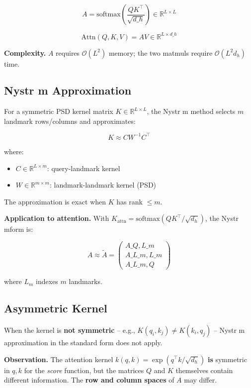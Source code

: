 \[
A = \text{softmax}\!\left(\frac{Q K^\top}{\sqrt{d\_h}}\right) \in \mathbb{R}^{L \times L}
\]

\[
\text{Attn}(Q, K, V) = A V \in \mathbb{R}^{L \times d\_h}
\]

\textbf{Complexity.} $A$ requires $\mathcal{O}(L^2)$ memory; the two matmuls 
require $\mathcal{O}(L^2 d_h)$ time.

\subsection{Nystr m Approximation}

For a symmetric PSD kernel matrix $K \in \mathbb{R}^{L \times L}$, the Nystr m 
method selects $m$ landmark rows/columns and approximates:

\[
K \approx C W^{-1} C^\top
\]

where:

\begin{itemize}
\item $C \in \mathbb{R}^{L \times m}$: query-landmark kernel
\item $W \in \mathbb{R}^{m \times m}$: landmark-landmark kernel (PSD)

\end{itemize}
The approximation is exact when $K$ has rank $\le m$.

\textbf{Application to attention.} With $K_\text{attn} = \text{softmax}(QK^\top / \sqrt{d_h})$, 
the Nystr mform is:

\[
A \approx \tilde{A} = \begin{pmatrix} A\_{Q, L\_m} \\ A\_{L\_m, L\_m} \\ A\_{L\_m, Q} \end{pmatrix}
\]

where $L_m$ indexes $m$ landmarks.

\subsection{Asymmetric Kernel}

When the kernel is \textbf{not symmetric} -- e.g., $K(q_i, k_j) \ne K(k_i, q_j)$ 
-- Nystr m approximation in the standard form does not apply.

\textbf{Observation.} The attention kernel $k(q, k) = \exp(q^\top k / \sqrt{d_h})$ 
\textbf{is} symmetric in $q, k$ for the \textit{score} function, but the matrices $Q$ and 
$K$ themselves contain different information. The \textbf{row and column spaces} 
of $A$ may differ.

